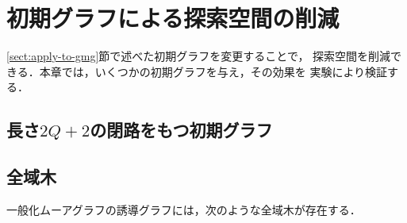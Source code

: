 
\chapter{初期グラフによる探索空間の削減}
\label{chap:reduce-by-initial-graph}
\ref{sect:apply-to-gmg}節で述べた初期グラフを変更することで，
探索空間を削減できる．本章では，いくつかの初期グラフを与え，その効果を
実験により検証する．

\section{長さ$2Q+2$の閉路をもつ初期グラフ}
\label{sect:initial-graph-cycle}

\section{全域木}
\label{sect:initial-spanning-tree}
\begin{conjecture}[全域木予想]
一般化ムーアグラフの誘導グラフには，次のような全域木が存在する．
\end{conjecture}

